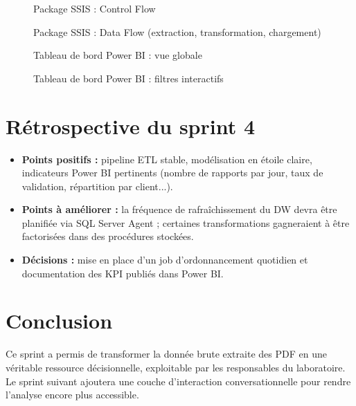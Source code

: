 \begin{figure}[h!]
\centering
{}
\caption{Package SSIS : Control Flow}
\end{figure}

\begin{figure}[h!]
\centering
{}
\caption{Package SSIS : Data Flow (extraction, transformation, chargement)}
\end{figure}

\begin{figure}[h!]
\centering
{}
\caption{Tableau de bord Power BI : vue globale}
\end{figure}

\begin{figure}[h!]
\centering
{}
\caption{Tableau de bord Power BI : filtres interactifs}
\end{figure}

\section{Rétrospective du sprint 4}
\begin{itemize}
\item \textbf{Points positifs :} pipeline ETL stable, modélisation en étoile claire,
indicateurs Power BI pertinents (nombre de rapports par jour, taux de validation,
répartition par client...).
\item \textbf{Points à améliorer :} la fréquence de rafraîchissement du DW devra être
planifiée via SQL Server Agent ; certaines transformations gagneraient à être
factorisées dans des procédures stockées.
\item \textbf{Décisions :} mise en place d'un job d'ordonnancement quotidien et
documentation des KPI publiés dans Power BI.
\end{itemize}

\section*{Conclusion}
Ce sprint a permis de transformer la donnée brute extraite des PDF en une véritable
ressource décisionnelle, exploitable par les responsables du laboratoire. Le
sprint suivant ajoutera une couche d'interaction conversationnelle pour rendre
l'analyse encore plus accessible.


